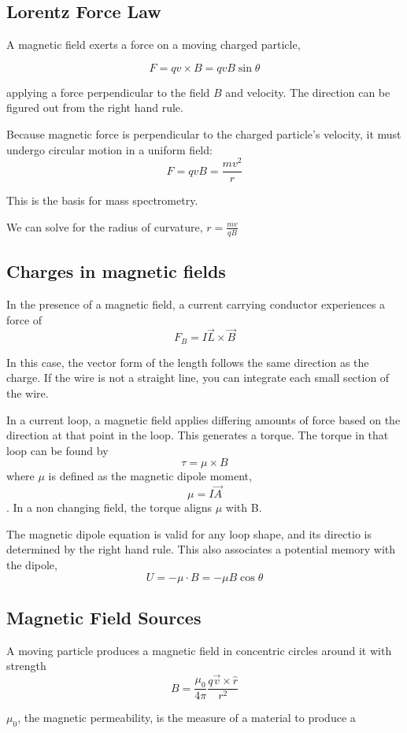 \documentclass{article}
\begin{document}
\subsection{Lorentz Force Law}

A magnetic field exerts a force on a moving charged particle,

$$F=q v \times B=qvB\sin{\theta}$$

applying a force perpendicular to the field $B$ and velocity. The direction can be figured out from the right hand rule.

Because magnetic force is perpendicular to the charged particle's velocity, it must undergo circular motion in a uniform field:
$$F=qvB=\frac{mv^2}{r}$$

This is the basis for mass spectrometry.

We can solve for the radius of curvature, $r=\frac{mv}{qB}$

\subsection{Charges in magnetic fields}

In the presence of a magnetic field, a current carrying conductor experiences a force of $$F_B=I \vec{L}\times\vec{B}$$

In this case, the vector form of the length follows the same direction as the charge.
If the wire is not a straight line, you can integrate each small section of the wire.

In a current loop, a magnetic field applies differing amounts of force based on the direction at that point in the loop. This generates a torque. The torque in that loop
can be found by $$\tau=\mu\times B$$ where $\mu$ is defined as the magnetic dipole moment, $$\mu=I\vec{A}$$. In a non changing field, the torque aligns $\mu$ with B.

The magnetic dipole equation is valid for any loop shape, and its directio is determined by the right hand rule. This also associates a potential memory with the dipole, 
$$U=-\mu\cdot B=-\mu B \cos{\theta}$$

\subsection{Magnetic Field Sources}
A moving particle produces a magnetic field in concentric circles around it 
with strength $$B=\frac{\mu_0}{4\pi} \frac{q\vec{v}\times \hat{r}}{r^2}$$

$\mu_0$, the magnetic permeability, is the measure of a material to produce a
\end{document}
